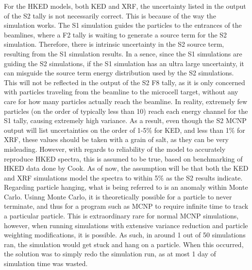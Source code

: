 For the HKED models, both KED and XRF, the uncertainty listed in the output of the S2 tally is not necessarily correct. This is because of the way the simulation works. The S1 simulation guides the particles to the entrances of the beamlines, where a F2 tally is waiting to generate a source term for the S2 simulation. Therefore, there is intrinsic uncertainty in the S2 source term, resulting from the S1 simulation results. In a sence, since the S1 simulations are guiding the S2 simulations, if the S1 simulation has an ultra large uncertainty, it can misguide the source term energy distribution used by the S2 simulations. This will not be reflected in the output of the S2 F8 tally, as it is only concerned with particles traveling from the beamline to the microcell target, without any care for how many particles actually reach the beamline. In reality, extremely few particles (on the order of typically less than 10) reach each energy channel for the S1 tally, causing extremely high variance. As a result, even though the S2 MCNP output will list uncertainties on the order of 1-5\% for KED, and less than 1\% for XRF, these values should be taken with a grain of salt, as they can be very misleading. However, with regards to reliability of the model to accurately reproduce HKED spectra, this is assumed to be true, based on benchmarking of HKED data done by Cook. As of now, the assumption will be that both the KED and XRF simulations model the spectra to within 5\% as the S2 results indicate. \\

Regarding particle hanging, what is being referred to is an anomaly within Monte Carlo. Usinng Monte Carlo, it is theoretically possible for a particle to never terminate, and thus for a program such as MCNP to require infinite time to track a particular particle. This is extraordinary rare for normal MCNP simulations, however, when running simulations with extensive variance reduction and particle weighting modifications, it is possible. As such, in around 1 out of 50 simulations ran, the simulation would get stuck and hang on a particle. When this occurred, the solution was to simply redo the simulation run, as at most 1 day of simulation time was wasted. \\




